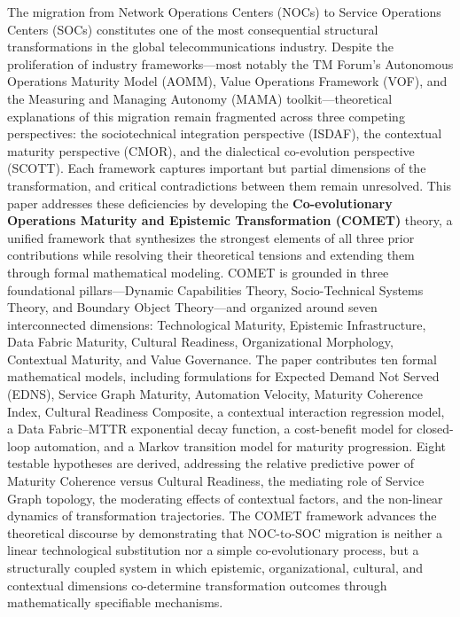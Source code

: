 \documentclass[12pt,a4paper]{article}
\begin{document}
The migration from Network Operations Centers (NOCs) to Service Operations Centers (SOCs) constitutes one of the most consequential structural transformations in the global telecommunications industry. Despite the proliferation of industry frameworks---most notably the TM Forum's Autonomous Operations Maturity Model (AOMM), Value Operations Framework (VOF), and the Measuring and Managing Autonomy (MAMA) toolkit---theoretical explanations of this migration remain fragmented across three competing perspectives: the sociotechnical integration perspective (ISDAF), the contextual maturity perspective (CMOR), and the dialectical co-evolution perspective (SCOTT). Each framework captures important but partial dimensions of the transformation, and critical contradictions between them remain unresolved. This paper addresses these deficiencies by developing the \textbf{Co-evolutionary Operations Maturity and Epistemic Transformation (COMET)} theory, a unified framework that synthesizes the strongest elements of all three prior contributions while resolving their theoretical tensions and extending them through formal mathematical modeling. COMET is grounded in three foundational pillars---Dynamic Capabilities Theory, Socio-Technical Systems Theory, and Boundary Object Theory---and organized around seven interconnected dimensions: Technological Maturity, Epistemic Infrastructure, Data Fabric Maturity, Cultural Readiness, Organizational Morphology, Contextual Maturity, and Value Governance. The paper contributes ten formal mathematical models, including formulations for Expected Demand Not Served (EDNS), Service Graph Maturity, Automation Velocity, Maturity Coherence Index, Cultural Readiness Composite, a contextual interaction regression model, a Data Fabric--MTTR exponential decay function, a cost-benefit model for closed-loop automation, and a Markov transition model for maturity progression. Eight testable hypotheses are derived, addressing the relative predictive power of Maturity Coherence versus Cultural Readiness, the mediating role of Service Graph topology, the moderating effects of contextual factors, and the non-linear dynamics of transformation trajectories. The COMET framework advances the theoretical discourse by demonstrating that NOC-to-SOC migration is neither a linear technological substitution nor a simple co-evolutionary process, but a structurally coupled system in which epistemic, organizational, cultural, and contextual dimensions co-determine transformation outcomes through mathematically specifiable mechanisms.
\end{document}
